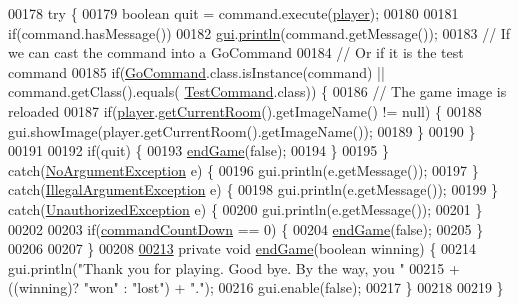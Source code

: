 \begin{DoxyCode}
00178         \textcolor{keywordflow}{try} \{
00179             \textcolor{keywordtype}{boolean} quit = command.execute(\hyperlink{classGameEngine_a4666c6719428cc43014b30b305eeef5d}{player});
00180 
00181             \textcolor{keywordflow}{if}(command.hasMessage())
00182                 \hyperlink{classGameEngine_a2a7d0bb6183b3f3ef3ee2008926374a0}{gui}.\hyperlink{classUserInterface_a79f606b4b1f5d1523e50eea00039ed94}{println}(command.getMessage());
00183             \textcolor{comment}{// If we can cast the command into a GoCommand}
00184             \textcolor{comment}{// Or if it is the test command}
00185             \textcolor{keywordflow}{if}(\hyperlink{classGoCommand}{GoCommand}.class.isInstance(command) || command.getClass().equals(
      \hyperlink{classTestCommand}{TestCommand}.class)) \{
00186                 \textcolor{comment}{// The game image is reloaded}
00187                 \textcolor{keywordflow}{if}(\hyperlink{classGameEngine_a4666c6719428cc43014b30b305eeef5d}{player}.\hyperlink{classPlayer_a3a3107df50fc4e35e8c0f46c3f776ce6}{getCurrentRoom}().getImageName() != null) \{
00188                     gui.showImage(player.getCurrentRoom().getImageName());
00189                 \}
00190             \}
00191 
00192             \textcolor{keywordflow}{if}(quit) \{
00193                 \hyperlink{classGameEngine_a1f5fa36c5dfc36c9a963fe439afc057b}{endGame}(\textcolor{keyword}{false});
00194             \}
00195         \} \textcolor{keywordflow}{catch}(\hyperlink{classNoArgumentException}{NoArgumentException} e) \{
00196             gui.println(e.getMessage());
00197         \} \textcolor{keywordflow}{catch}(\hyperlink{classIllegalArgumentException}{IllegalArgumentException} e) \{
00198             gui.println(e.getMessage());
00199         \} \textcolor{keywordflow}{catch}(\hyperlink{classUnauthorizedException}{UnauthorizedException} e) \{
00200             gui.println(e.getMessage());
00201         \}
00202 
00203         \textcolor{keywordflow}{if}(\hyperlink{classGameEngine_ad4ff8d760eced9c7b76cdeb0dc989975}{commandCountDown} == 0) \{
00204             \hyperlink{classGameEngine_a1f5fa36c5dfc36c9a963fe439afc057b}{endGame}(\textcolor{keyword}{false});
00205         \}
00206 
00207     \}
00208 
\hypertarget{GameEngine_8java_source_l00213}{}\hyperlink{classGameEngine_a1f5fa36c5dfc36c9a963fe439afc057b}{00213}     \textcolor{keyword}{private} \textcolor{keywordtype}{void} \hyperlink{classGameEngine_a1f5fa36c5dfc36c9a963fe439afc057b}{endGame}(\textcolor{keywordtype}{boolean} winning) \{
00214         gui.println(\textcolor{stringliteral}{"Thank you for playing. Good bye. By the way, you "}
00215                 + ((winning)? \textcolor{stringliteral}{"won"} : \textcolor{stringliteral}{"lost"}) + \textcolor{stringliteral}{"."});
00216         gui.enable(\textcolor{keyword}{false});
00217     \}
00218 
00219 \}
\end{DoxyCode}
